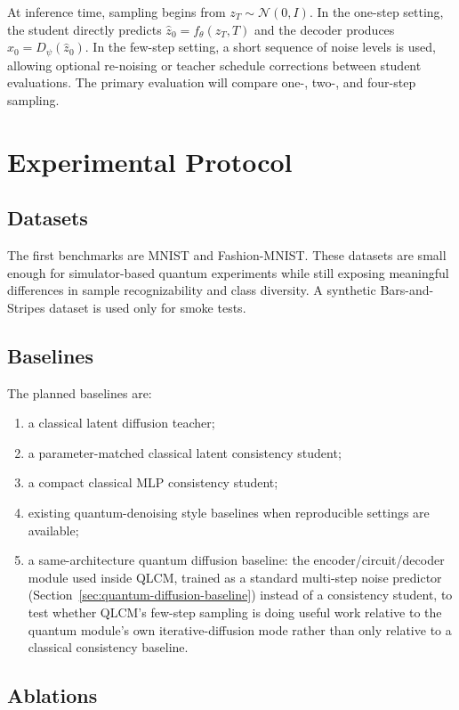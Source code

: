 \documentclass[11pt]{article}
\begin{document}
At inference time, sampling begins from $z_T \sim \mathcal{N}(0,I)$. In the
one-step setting, the student directly predicts $\hat{z}_0=f_\theta(z_T,T)$ and
the decoder produces $\hat{x}_0=D_\psi(\hat{z}_0)$. In the few-step setting, a
short sequence of noise levels is used, allowing optional re-noising or teacher
schedule corrections between student evaluations. The primary evaluation will
compare one-, two-, and four-step sampling.

\section{Experimental Protocol}

\subsection{Datasets}

The first benchmarks are MNIST and Fashion-MNIST. These datasets are small
enough for simulator-based quantum experiments while still exposing meaningful
differences in sample recognizability and class diversity. A synthetic
Bars-and-Stripes dataset is used only for smoke tests.

\subsection{Baselines}

The planned baselines are:
\begin{enumerate}
    \item a classical latent diffusion teacher;
    \item a parameter-matched classical latent consistency student;
    \item a compact classical MLP consistency student;
    \item existing quantum-denoising style baselines when reproducible settings
    are available;
    \item a same-architecture quantum diffusion baseline: the encoder/circuit/decoder
    module used inside QLCM, trained as a standard multi-step noise predictor
    (Section~\ref{sec:quantum-diffusion-baseline}) instead of a consistency
    student, to test whether QLCM's few-step sampling is doing useful work
    relative to the quantum module's own iterative-diffusion mode rather than
    only relative to a classical consistency baseline.
\end{enumerate}

\subsection{Ablations}
\end{document}
